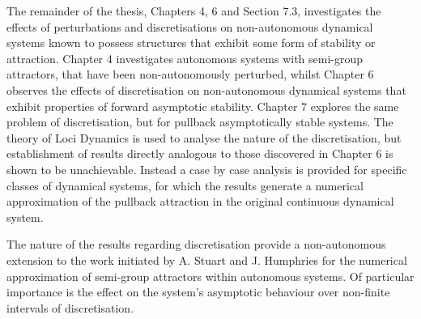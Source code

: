 The remainder of the thesis, Chapters 4, 6 and Section 7.3, investigates the
effects of perturbations and discretisations on non-autonomous dynamical systems
known to possess structures that exhibit some form of stability or attraction.
Chapter 4 investigates autonomous systems with semi-group attractors, that have
been non-autonomously perturbed, whilst Chapter 6 observes the effects of
discretisation on non-autonomous dynamical systems that exhibit properties of
forward asymptotic stability. Chapter 7 explores the same problem of
discretisation, but for pullback asymptotically stable systems. The
theory of Loci Dynamics is used to analyse the nature of the discretisation,
but establishment of results directly analogous to those discovered in
Chapter 6 is shown to be unachievable. Instead a case by case analysis is
provided for specific classes of dynamical systems, for which the results
generate a numerical approximation of the pullback attraction in the original
continuous dynamical system.

The nature of the results regarding discretisation provide a non-autonomous
extension to the work initiated by A. Stuart and J. Humphries \cite{St94,StHu96}
for the numerical approximation of semi-group attractors within autonomous
systems. Of particular importance is the effect on the system's asymptotic
behaviour over non-finite intervals of discretisation.

\endinput
